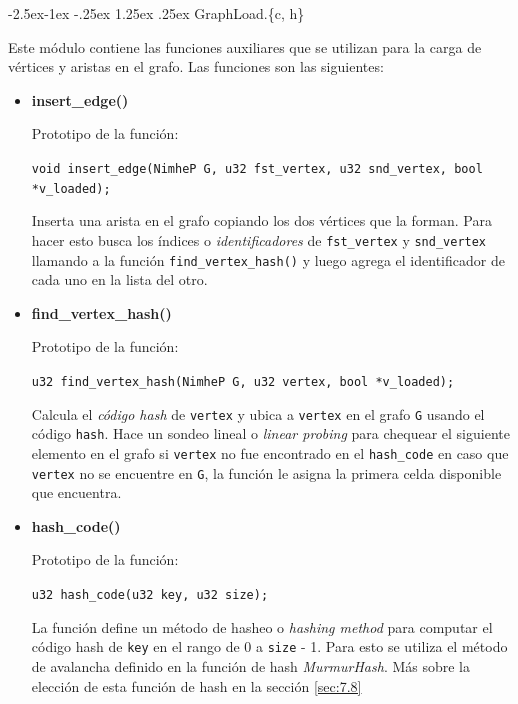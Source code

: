 \documentclass[11pt,a4paper]{article}
\makeatletter
\renewcommand\paragraph{\@startsection{paragraph}{4}{\z@}%
            {-2.5ex\@plus -1ex \@minus -.25ex}%
            {1.25ex \@plus .25ex}%
            {\normalfont\normalsize\bfseries}}
\theoremstyle{plain}
\makeatother
\begin{document}
				\paragraph{GraphLoad.\{c, h\}}
				\label{sec:3.2.1.3}

Este módulo contiene las funciones auxiliares que se utilizan para la carga de vértices y aristas en el grafo. Las funciones son las siguientes:

\begin{itemize}
\item{\textbf{{insert\_edge()}}}

Prototipo de la función:

\texttt{void insert\_edge(NimheP G, u32 fst\_vertex, u32 snd\_vertex, bool *v\_loaded);}

Inserta una arista en el grafo copiando los dos vértices que la forman. Para hacer esto busca los índices o \emph{identificadores} de \texttt{fst\_vertex} y \texttt{snd\_vertex} llamando a la función \texttt{find\_vertex\_hash()} y luego agrega el identificador de cada uno en la lista del otro.

\item{\textbf{{find\_vertex\_hash()}}}

Prototipo de la función:

\texttt{u32 find\_vertex\_hash(NimheP G, u32\ vertex, bool *v\_loaded);}

Calcula el \emph{código hash} de \texttt{vertex} y ubica a \texttt{vertex} en el grafo \texttt{G} usando el código \texttt{hash}. Hace un sondeo lineal o \emph{linear probing} para chequear el siguiente elemento en el grafo si \texttt{vertex} no fue encontrado en el \texttt{hash\_code} en caso que \texttt{vertex} no se encuentre en \texttt{G}, la función le asigna la primera celda disponible que encuentra.

\item{\textbf{{hash\_code()}}}

Prototipo de la función:

\texttt{u32 hash\_code(u32 key, u32 size);}

La función define un método de hasheo o \emph{hashing method} para computar el código hash de \texttt{key} en el rango de 0 a \texttt{size} - 1. Para esto se utiliza el método de avalancha definido en la función de hash \emph{MurmurHash}. Más sobre la elección de esta función de hash en la sección \ref{sec:7.8}

\end{itemize}
\end{document}
